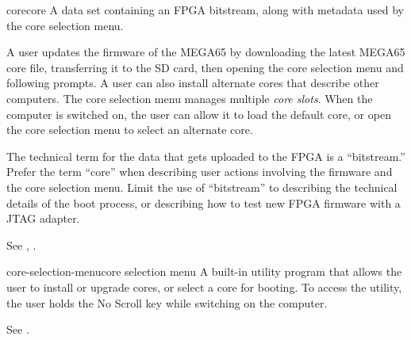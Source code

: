 \begin{sgentry}{core}{core}
    A data set containing an FPGA bitstream, along with metadata used by the core selection menu.

    A user updates the firmware of the MEGA65 by downloading the latest MEGA65 core file, transferring it to the SD card, then opening the core selection menu and following prompts. A user can also install alternate cores that describe other computers. The core selection menu manages multiple \emph{core slots}. When the computer is switched on, the user can allow it to load the default core, or open the core selection menu to select an alternate core.

    The technical term for the data that gets uploaded to the FPGA is a ``bitstream.'' Prefer the term ``core'' when describing user actions involving the firmware and the core selection menu. Limit the use of ``bitstream'' to describing the technical details of the boot process, or describing how to test new FPGA firmware with a JTAG adapter.

    See , .
\end{sgentry}

\begin{sgentry}{core-selection-menu}{core selection menu}
    A built-in utility program that allows the user to install or upgrade cores, or select a core for booting. To access the utility, the user holds the No Scroll key while switching on the computer.

    See .
\end{sgentry}


